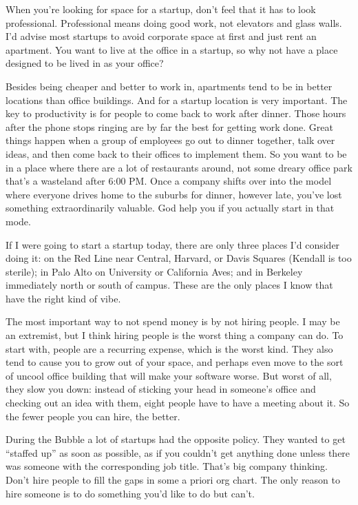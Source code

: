 \documentclass[12pt]{book}
\begin{document}
When you're looking for space for a startup, don't feel that it has to
look professional. Professional means doing good work, not elevators and
glass walls. I'd advise most startups to avoid corporate space at first
and just rent an apartment. You want to live at the office in a startup,
so why not have a place designed to be lived in as your office?

Besides being cheaper and better to work in, apartments tend to be in
better locations than office buildings. And for a startup location is
very important. The key to productivity is for people to come back to
work after dinner. Those hours after the phone stops ringing are by far
the best for getting work done. Great things happen when a group of
employees go out to dinner together, talk over ideas, and then come back
to their offices to implement them. So you want to be in a place where
there are a lot of restaurants around, not some dreary office park
that's a wasteland after 6:00 PM. Once a company shifts over into the
model where everyone drives home to the suburbs for dinner, however
late, you've lost something extraordinarily valuable. God help you if
you actually start in that mode.

If I were going to start a startup today, there are only three places
I'd consider doing it: on the Red Line near Central, Harvard, or Davis
Squares (Kendall is too sterile); in Palo Alto on University or
California Aves; and in Berkeley immediately north or south of campus.
These are the only places I know that have the right kind of vibe.

The most important way to not spend money is by not hiring people. I may
be an extremist, but I think hiring people is the worst thing a company
can do. To start with, people are a recurring expense, which is the
worst kind. They also tend to cause you to grow out of your space, and
perhaps even move to the sort of uncool office building that will make
your software worse. But worst of all, they slow you down: instead of
sticking your head in someone's office and checking out an idea with
them, eight people have to have a meeting about it. So the fewer people
you can hire, the better.

During the Bubble a lot of startups had the opposite policy. They wanted
to get ``staffed up'' as soon as possible, as if you couldn't get
anything done unless there was someone with the corresponding job title.
That's big company thinking. Don't hire people to fill the gaps in some
a priori org chart. The only reason to hire someone is to do something
you'd like to do but can't.
\end{document}
